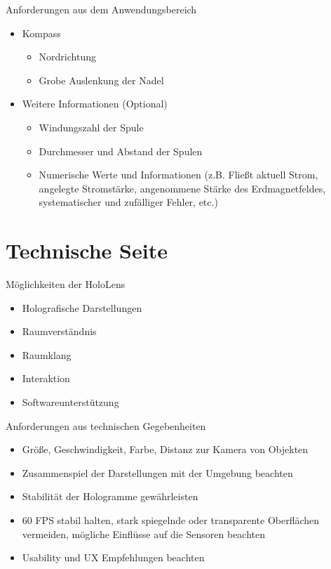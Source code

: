 \begin{frame}[fragile]{Anforderungen aus dem Anwendungsbereich}
\begin{itemize}
\setlength{\itemsep}{-0.25em}
\item Kompass
\begin{itemize}
\setlength{\itemsep}{-0.25em}
\item Nordrichtung
\item Grobe Auslenkung der Nadel
\end{itemize}
\item Weitere Informationen (Optional)
\begin{itemize}
\item Windungszahl der Spule
\item Durchmesser und Abstand der Spulen
\item Numerische Werte und Informationen (z.B. Fließt aktuell Strom, angelegte Stromstärke, angenommene Stärke des Erdmagnetfeldes, systematischer und zufälliger Fehler, etc.)
\end{itemize}
\end{itemize}
\end{frame}

\part{Technische Seite}
\label{part:tech}
\begin{frame}[fragile]{Möglichkeiten der HoloLens}
\begin{minipage}{0.5\textwidth}
	{
		\begin{itemize}[itemsep=1mm]
			\item Holografische Darstellungen
			\item Raumverständnis
			\item Raumklang
			\item Interaktion
			\item Softwareunterstützung
		\end{itemize}
	}
\end{minipage}
\begin{minipage}{0.48\textwidth}
\end{minipage}
\end{frame}

\begin{frame}[fragile]{Anforderungen aus technischen Gegebenheiten}
\begin{itemize}
\item Größe, Geschwindigkeit, Farbe, Distanz zur Kamera von Objekten
\pause
\item Zusammenspiel der Darstellungen mit der Umgebung beachten
\pause
\item Stabilität der Hologramme gewährleisten
\pause
\item 60 FPS stabil halten, stark spiegelnde oder transparente Oberflächen vermeiden, mögliche Einflüsse auf die Sensoren beachten
\pause
\item Usability und UX Empfehlungen beachten
\end{itemize}
\end{frame}


